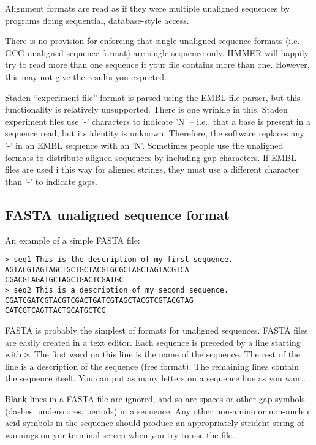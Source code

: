Alignment formats are read as if they were multiple unaligned
sequences by programs doing sequential, database-style access.

There is no provision for enforcing that single unaligned sequence
formats (i.e. GCG unaligned sequence format) are single sequence
only. HMMER will happily try to read more than one sequence if your
file contains more than one. However, this may not give the results
you expected.

Staden ``experiment file'' format is parsed using the EMBL file
parser, but this functionality is relatively unsupported. There is one
wrinkle in this. Staden experiment files use '-' characters to
indicate 'N' -- i.e., that a base is present in a sequence read, but
its identity is unknown. Therefore, the software replaces any '-' in
an EMBL sequence with an 'N'. Sometimes people use the unaligned
formats to distribute aligned sequences by including gap
characters. If EMBL files are used i this way for aligned strings,
they must use a different character than '-' to indicate gaps.

\subsection{FASTA unaligned sequence format}

An example of a simple FASTA file: 

\begin{verbatim}
> seq1 This is the description of my first sequence.
AGTACGTAGTAGCTGCTGCTACGTGCGCTAGCTAGTACGTCA
CGACGTAGATGCTAGCTGACTCGATGC
> seq2 This is a description of my second sequence.
CGATCGATCGTACGTCGACTGATCGTAGCTACGTCGTACGTAG
CATCGTCAGTTACTGCATGCTCG
\end{verbatim}

FASTA is probably the simplest of formats for unaligned sequences.
FASTA files are easily created in a text editor.  Each sequence is
preceded by a line starting with \verb+>+. The first word on this line
is the name of the sequence. The rest of the line is a description of
the sequence (free format). The remaining lines contain the sequence
itself. You can put as many letters on a sequence line as you want.

Blank lines in a FASTA file are ignored, and so are spaces or other
gap symbols (dashes, underscores, periods) in a sequence. Any other
non-amino or non-nucleic acid symbols in the sequence should produce
an appropriately strident string of warnings on yur terminal screen
when you try to use the file.

